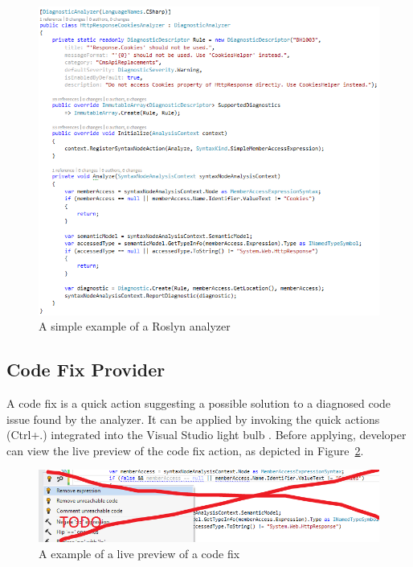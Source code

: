 \documentclass[
  digital, %
  table,   %
  lof,     %
  lot,     %
  oneside,
]{fithesis3}
\begin{document}
\begin{figure}[h!]
		\centering
			\includegraphics[scale=0.65]{img/analyzer-example}
		\caption{A simple example of a Roslyn analyzer}
		\label{fig:analyzer-example}
\end{figure}

\subsection{Code Fix Provider}
A code fix is a quick action suggesting a possible solution to a diagnosed code issue found by the analyzer. It can be applied by invoking the quick actions (Ctrl+.) integrated into the Visual Studio light bulb . Before applying, developer can view the live preview of the code fix action, as depicted in Figure~\ref{fig:codefix-example}.

\begin{figure}[h!]
		\centering
			\includegraphics[scale=0.65]{img/codefix-example}
		\caption{A example of a live preview of a code fix}
		\label{fig:codefix-example}
\end{figure}
\end{document}
